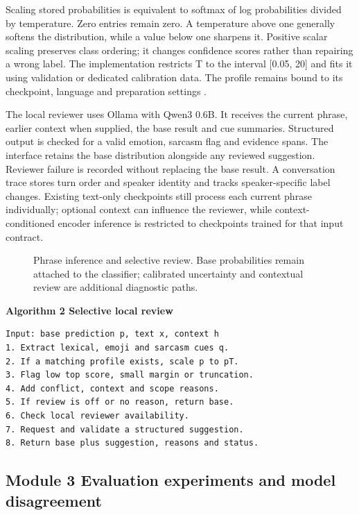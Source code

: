\documentclass[conference]{IEEEtran}
\begin{document}
Scaling stored probabilities is equivalent to softmax of log probabilities divided by temperature. Zero entries remain zero. A temperature above one generally softens the distribution, while a value below one sharpens it. Positive scalar scaling preserves class ordering; it changes confidence scores rather than repairing a wrong label. The implementation restricts T to the interval [0.05, 20] and fits it using validation or dedicated calibration data. The profile remains bound to its checkpoint, language and preparation settings \cite{guo2017}.

The local reviewer uses Ollama with Qwen3 0.6B. It receives the current phrase, earlier context when supplied, the base result and cue summaries. Structured output is checked for a valid emotion, sarcasm flag and evidence spans. The interface retains the base distribution alongside any reviewed suggestion. Reviewer failure is recorded without replacing the base result. A conversation trace stores turn order and speaker identity and tracks speaker-specific label changes. Existing text-only checkpoints still process each current phrase individually; optional context can influence the reviewer, while context-conditioned encoder inference is restricted to checkpoints trained for that input contract.

\begin{figure}[!t]
\centering
\resizebox{.98\columnwidth}{!}{}
\caption{Phrase inference and selective review. Base probabilities remain attached to the classifier; calibrated uncertainty and contextual review are additional diagnostic paths.}\label{fig:prediction-review}
\end{figure}


\noindent\begin{minipage}{\columnwidth}
\textbf{Algorithm 2 Selective local review}
\begin{lstlisting}
Input: base prediction p, text x, context h
1. Extract lexical, emoji and sarcasm cues q.
2. If a matching profile exists, scale p to pT.
3. Flag low top score, small margin or truncation.
4. Add conflict, context and scope reasons.
5. If review is off or no reason, return base.
6. Check local reviewer availability.
7. Request and validate a structured suggestion.
8. Return base plus suggestion, reasons and status.
\end{lstlisting}
\end{minipage}

\subsection{Module 3 Evaluation experiments and model disagreement}
\end{document}
